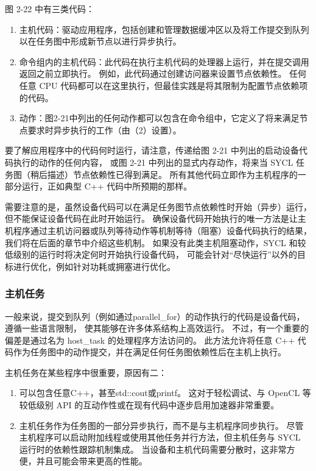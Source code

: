 图 2-22 中有三类代码：

\begin{enumerate}
	\item 主机代码：驱动应用程序，包括创建和管理数据缓冲区以及将工作提交到队列以在任务图中形成新节点以进行异步执行。

	\item 命令组内的主机代码：此代码在执行主机代码的处理器上运行，并在提交调用返回之前立即执行。 
	例如，此代码通过创建访问器来设置节点依赖性。 
	任何任意 CPU 代码都可以在这里执行，但最佳实践是将其限制为配置节点依赖项的代码。

	\item 动作：图2-21中列出的任何动作都可以包含在命令组中，它定义了将来满足节点要求时异步执行的工作（由（2）设置）。
\end{enumerate}

要了解应用程序中的代码何时运行，请注意，传递给图 2-21 中列出的启动设备代码执行的动作的任何内容，
或图 2-21 中列出的显式内存动作，将来当 SYCL 任务图（稍后描述）节点依赖性已得到满足。 
所有其他代码立即作为主机程序的一部分运行，正如典型 C++ 代码中所预期的那样。

需要注意的是，虽然设备代码可以在满足任务图节点依赖性时开始（异步）运行，但不能保证设备代码在此时开始运行。 
确保设备代码开始执行的唯一方法是让主机程序通过主机访问器或队列等待动作等机制等待（阻塞）设备代码执行的结果，
我们将在后面的章节中介绍这些机制。 如果没有此类主机阻塞动作，SYCL 和较低级别的运行时将决定何时开始执行设备代码，
可能会针对“尽快运行”以外的目标进行优化，例如针对功耗或拥塞进行优化。

\subsubsection{主机任务}
一般来说，提交到队列（例如通过parallel\_for）的动作执行的代码是设备代码，遵循一些语言限制，
使其能够在许多体系结构上高效运行。 不过，有一个重要的偏差是通过名为 host\_task 的处理程序方法访问的。 
此方法允许将任意 C++ 代码作为任务图中的动作提交，并在满足任何任务图依赖性后在主机上执行。

主机任务在某些程序中很重要，原因有二：
\begin{enumerate}
	\item 可以包含任意C++，甚至std::cout或printf。 
	这对于轻松调试、与 OpenCL 等较低级别 API 的互动作性或在现有代码中逐步启用加速器非常重要。

	\item 主机任务作为任务图的一部分异步执行，而不是与主机程序同步执行。 
	尽管主机程序可以启动附加线程或使用其他任务并行方法，但主机任务与 SYCL 运行时的依赖性跟踪机制集成。 
	当设备和主机代码需要分散时，这非常方便，并且可能会带来更高的性能。
\end{enumerate}

